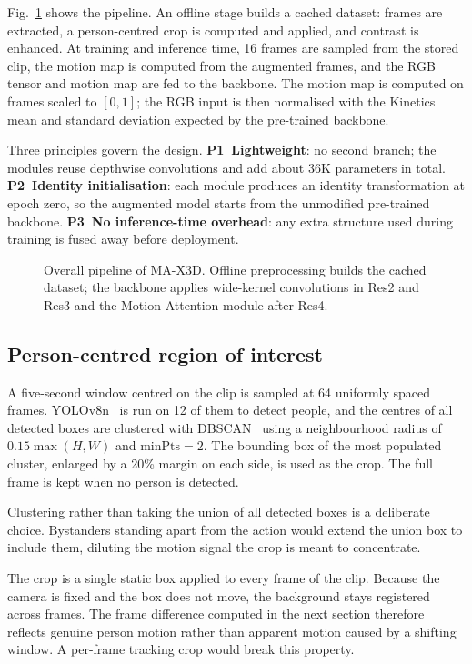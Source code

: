 \documentclass[conference]{IEEEtran}
\begin{document}
Fig.~\ref{fig:pipeline} shows the pipeline. An offline stage builds
a cached dataset: frames are extracted, a person-centred crop is
computed and applied, and contrast is enhanced. At training and
inference time, 16 frames are sampled from the stored clip, the motion
map is computed from the augmented frames, and the RGB tensor and
motion map are fed to the backbone. The motion map is computed on frames
scaled to $[0,1]$; the RGB input is then normalised with the Kinetics
mean and standard deviation expected by the pre-trained backbone.

Three principles govern the design. \textbf{P1~Lightweight}: no second
branch; the modules reuse depthwise convolutions and add about 36K
parameters in total. \textbf{P2~Identity initialisation}: each module
produces an identity transformation at epoch zero, so the augmented
model starts from the unmodified pre-trained backbone.
\textbf{P3~No inference-time overhead}: any extra structure used during
training is fused away before deployment.

\begin{figure}[t]
  \centering
  \caption{Overall pipeline of MA-X3D. Offline preprocessing builds the
  cached dataset; the backbone applies wide-kernel convolutions in Res2
  and Res3 and the Motion Attention module after Res4.}
  \label{fig:pipeline}
\end{figure}

\subsection{Person-centred region of interest}

A five-second window centred on the clip is sampled at 64 uniformly
spaced frames. YOLOv8n~\cite{yolov8} is run on 12 of them to detect
people, and the centres of all detected boxes are clustered with
DBSCAN~\cite{dbscan} using a neighbourhood radius of
$0.15 \max(H, W)$ and $\mathrm{minPts}=2$. The bounding box of the
most populated cluster, enlarged by a 20\% margin on each side, is
used as the crop. The full frame is kept when no person is detected.

Clustering rather than taking the union of all detected boxes is a
deliberate choice. Bystanders standing apart from the action would
extend the union box to include them, diluting the motion signal the
crop is meant to concentrate.

The crop is a single static box applied to every frame of the clip.
Because the camera is fixed and the box does not move, the background
stays registered across frames. The frame difference computed in the
next section therefore reflects genuine person motion rather than
apparent motion caused by a shifting window. A per-frame tracking crop
would break this property.
\end{document}
